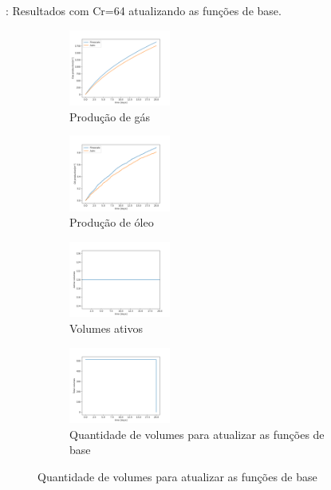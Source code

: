 \documentclass[professionalfont]{beamer}
\begin{document}
\begin{frame}{\FrameProblemName: {\small Resultados com Cr=64 atualizando as funções de base.}}
    \begin{figure}[!ht]
        \centering
        \begin{subfigure}{.48\textwidth}
            \centering
            \includegraphics[height=2.5cm]{./imgs/pr3/cr64/update/svgtopng/gas_prod.png}
            \caption{Produção de gás}
        \end{subfigure}
        \hfill
        \begin{subfigure}{.48\textwidth}
            \centering
            \includegraphics[height=2.5cm]{./imgs/pr3/cr64/update/svgtopng/oil_prod.png}
            \caption{Produção de óleo}
        \end{subfigure}
        \bigskip
        \begin{subfigure}{.48\textwidth}
            \centering
            \includegraphics[height=2.5cm]{./imgs/pr3/cr64/update/svgtopng/volumes_ativos.png}
            \caption{Volumes ativos}
        \end{subfigure}
        \hfill
        \begin{subfigure}{.48\textwidth}
            \centering
            \includegraphics[height=2.5cm]{./imgs/pr3/cr64/update/svgtopng/volumes_update.png}
            \caption{Quantidade de volumes para atualizar as funções de base}
        \end{subfigure}
        \label{fig:fig2_pr3-cr64}
        
    \end{figure}
    
\end{frame}
\end{document}
